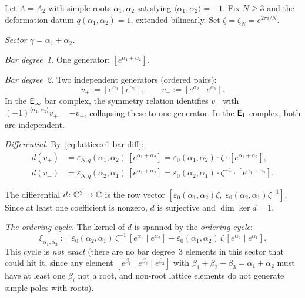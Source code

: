 \begin{computation}
\label{comp:lattice:e1-bar-A2}
Let $\Lambda = A_2$ with simple roots $\alpha_1, \alpha_2$
satisfying $\langle\alpha_1,\alpha_2\rangle = -1$.  Fix $N \geq 3$
and the deformation datum $q(\alpha_1,\alpha_2) = 1$, extended
bilinearly.  Set $\zeta = \zeta_N = e^{2\pi i/N}$.

\noindent\emph{Sector $\gamma = \alpha_1 + \alpha_2$.}

\emph{Bar degree~1.} One generator: $[e^{\alpha_1+\alpha_2}]$.

\emph{Bar degree~2.} Two independent generators (ordered pairs):
\[
v_+ := [e^{\alpha_1} \mid e^{\alpha_2}],
\qquad
v_- := [e^{\alpha_2} \mid e^{\alpha_1}].
\]
In the $\mathsf{E}_{\infty}$ bar complex, the symmetry relation identifies
$v_-$ with $(-1)^{\langle\alpha_1,\alpha_2\rangle} v_+ = -v_+$,
collapsing these to one generator.  In the $\mathsf{E}_1$ complex,
both are independent.

\emph{Differential.}
By~\eqref{eq:lattice:e1-bar-diff}:
\begin{align*}
d(v_+)
&= \varepsilon_{N,q}(\alpha_1, \alpha_2)\,
   [e^{\alpha_1+\alpha_2}]
 = \varepsilon_0(\alpha_1,\alpha_2) \cdot \zeta \cdot
   [e^{\alpha_1+\alpha_2}], \\
d(v_-)
&= \varepsilon_{N,q}(\alpha_2, \alpha_1)\,
   [e^{\alpha_1+\alpha_2}]
 = \varepsilon_0(\alpha_2,\alpha_1) \cdot \zeta^{-1} \cdot
   [e^{\alpha_1+\alpha_2}].
\end{align*}

The differential $d \colon \mathbb{C}^2 \to \mathbb{C}$ is the row vector
$[\varepsilon_0(\alpha_1,\alpha_2)\zeta,\;
\varepsilon_0(\alpha_2,\alpha_1)\zeta^{-1}]$.
Since at least one coefficient is nonzero, $d$ is surjective and
$\dim\ker d = 1$.

\emph{The ordering cycle.}
The kernel of $d$ is spanned by the
\emph{ordering cycle}:
\begin{equation}\label{eq:lattice:ordering-cycle}
\xi_{\alpha_1,\alpha_2}
:= \varepsilon_0(\alpha_2,\alpha_1)\,\zeta^{-1}\,
   [e^{\alpha_1} \mid e^{\alpha_2}]
 - \varepsilon_0(\alpha_1,\alpha_2)\,\zeta\,
   [e^{\alpha_2} \mid e^{\alpha_1}].
\end{equation}
This cycle is \emph{not exact} (there are no bar degree~3 elements
in this sector that could hit it, since any element
$[e^{\beta_1} \mid e^{\beta_2} \mid e^{\beta_3}]$ with
$\beta_1 + \beta_2 + \beta_3 = \alpha_1 + \alpha_2$ must have at
least one $\beta_i$ not a root, and non-root lattice elements do not
generate simple poles with roots).


\end{computation}
